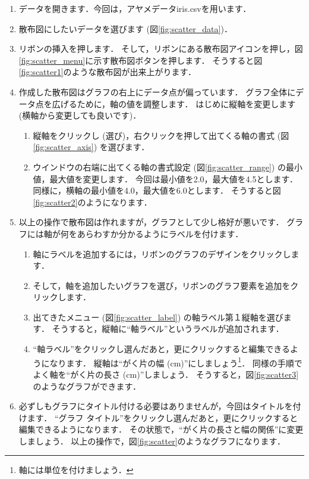 \begin{enumerate}
    \item データを開きます．今回は，アヤメデータiris.csvを用います．
    \item 散布図にしたいデータを選びます (図\ref{fig:scatter_data})．
    \item リボンの挿入を押します．
    そして，リボンにある散布図アイコンを押し，図\ref{fig:scatter_menu}に示す散布図ボタンを押します．
    そうすると図\ref{fig:scatter1}のような散布図が出来上がります．
    \item 作成した散布図はグラフの右上にデータ点が偏っています．
    グラフ全体にデータ点を広げるために，軸の値を調整します．
    はじめに縦軸を変更します (横軸から変更しても良いです)．
    \begin{enumerate}
        \item 縦軸をクリックし (選び)，右クリックを押して出てくる軸の書式 (図\ref{fig:scatter_axis}) を選びます．
        \item ウインドウの右端に出てくる軸の書式設定 (図\ref{fig:scatter_range}) の最小値，最大値を変更します．
        今回は最小値を2.0，最大値を4.5とします．
        同様に，横軸の最小値を4.0，最大値を6.0とします．
        そうすると図\ref{fig:scatter2}のようになります．
    \end{enumerate}
    \item 以上の操作で散布図は作れますが，グラフとして少し格好が悪いです．
    グラフには軸が何をあらわすか分かるようにラベルを付けます．
    \begin{enumerate}
        \item 軸にラベルを追加するには，リボンのグラフのデザインをクリックします．
        \item そして，軸を追加したいグラフを選び，リボンのグラフ要素を追加をクリックします．
        \item 出てきたメニュー (図\ref{fig:scatter_label}) の軸ラベル第１縦軸を選びます．
        そうすると，縦軸に``軸ラベル''というラベルが追加されます．
        \item ``軸ラベル''をクリックし選んだあと，更にクリックすると編集できるようになります．
        縦軸は``がく片の幅 (cm)''にしましょう\footnote{軸には単位を付けましょう．}．
        同様の手順でよく軸を``がく片の長さ (cm)''しましょう．
        そうすると，図\ref{fig:scatter3}のようなグラフができます．
    \end{enumerate}
    \item 必ずしもグラフにタイトル付ける必要はありませんが，今回はタイトルを付けます．
    ``グラフ タイトル''をクリックし選んだあと，更にクリックすると編集できるようになります．
    その状態で，``がく片の長さと幅の関係''に変更しましょう．
    以上の操作で，図\ref{fig:scatter}のようなグラフになります．
\end{enumerate}



